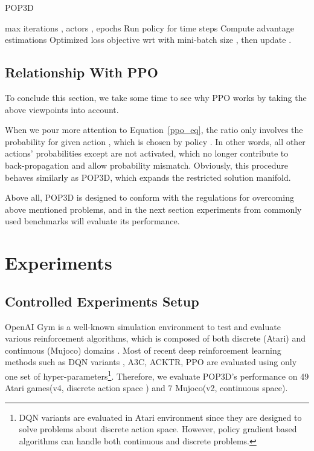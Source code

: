 \documentclass{article}
\begin{document}
\begin{algorithm}[tb]
	\caption{POP3D}
	\label{pop3d}
	\begin{algorithmic}[1]
		 max iterations  , actors , epochs 
		\STATE Run policy  for  time steps 
		\STATE Compute advantage estimations 
		\ENDFOR
		\STATE Optimized loss objective wrt  with mini-batch size , then update .
		\ENDFOR
		\ENDFOR
	\end{algorithmic}
\end{algorithm}



\subsection{Relationship With PPO}
To conclude this section, we take some time to see why PPO works by taking the above viewpoints into account. 

When we pour more attention to  Equation~\ref{ppo_eq}, the ratio  only involves the probability for given action , which is chosen by policy . In other words,  all other actions' probabilities except  are not activated, which no longer contribute to back-propagation and allow probability mismatch. Obviously, this procedure behaves similarly as POP3D, which expands the restricted solution manifold.

Above all, POP3D is designed to conform with the regulations for overcoming above mentioned problems, and in the next section experiments from commonly used benchmarks will evaluate its performance.

\section{Experiments}
\subsection{Controlled Experiments Setup}

OpenAI Gym is a well-known simulation environment to test and evaluate various reinforcement algorithms, which is composed of  both discrete (Atari) and continuous (Mujoco) domains \cite{brockman2016openai}. Most of recent deep reinforcement learning  methods such as DQN variants \cite{van2016deep,wang2015dueling,schaul2015prioritized,bellemare2017distributional,hessel2017rainbow}, A3C, ACKTR, PPO are evaluated using only one set of hyper-parameters\footnote{DQN variants are evaluated in Atari environment since they are designed to solve problems about discrete action space. However, policy gradient based algorithms can handle both continuous and discrete problems.}. Therefore,  we evaluate POP3D's performance on 49 Atari games(v4, discrete action space ) and 7 Mujoco(v2, continuous space).
\end{document}
